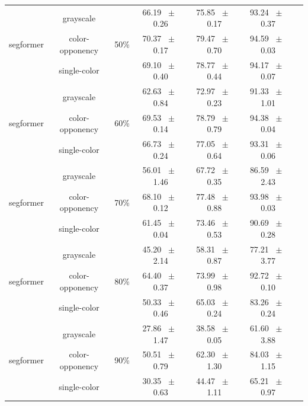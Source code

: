 \begin{table}[h]
\begin{tabular}{@{}lccc ccc@{}}
    \midrule
    \multirow{3}{*}{segformer} & grayscale & \multirow{3}{*}{50\%} & 66.19 ~$\pm$~ 0.26 & 75.85 ~$\pm$~ 0.17 & 93.24 ~$\pm$~ 0.37 \\
    & color-opponency &  & 70.37 ~$\pm$~ 0.17 & 79.47 ~$\pm$~ 0.70 & 94.59 ~$\pm$~ 0.03 \\
    & single-color &  & 69.10 ~$\pm$~ 0.40 & 78.77 ~$\pm$~ 0.44 & 94.17 ~$\pm$~ 0.07 \\
    \midrule
    \multirow{3}{*}{segformer} & grayscale & \multirow{3}{*}{60\%} & 62.63 ~$\pm$~ 0.84 & 72.97 ~$\pm$~ 0.23 & 91.33 ~$\pm$~ 1.01 \\
    & color-opponency &  & 69.53 ~$\pm$~ 0.14 & 78.79 ~$\pm$~ 0.79 & 94.38 ~$\pm$~ 0.04 \\
    & single-color &  & 66.73 ~$\pm$~ 0.24 & 77.05 ~$\pm$~ 0.64 & 93.31 ~$\pm$~ 0.06 \\
    \midrule
    \multirow{3}{*}{segformer} & grayscale & \multirow{3}{*}{70\%} & 56.01 ~$\pm$~ 1.46 & 67.72 ~$\pm$~ 0.35 & 86.59 ~$\pm$~ 2.43 \\
    & color-opponency &  & 68.10 ~$\pm$~ 0.12 & 77.48 ~$\pm$~ 0.88 & 93.98 ~$\pm$~ 0.03 \\
    & single-color &  & 61.45 ~$\pm$~ 0.04 & 73.46 ~$\pm$~ 0.53 & 90.69 ~$\pm$~ 0.28 \\
    \midrule
    \multirow{3}{*}{segformer} & grayscale & \multirow{3}{*}{80\%} & 45.20 ~$\pm$~ 2.14 & 58.31 ~$\pm$~ 0.87 & 77.21 ~$\pm$~ 3.77 \\
    & color-opponency &  & 64.40 ~$\pm$~ 0.37 & 73.99 ~$\pm$~ 0.98 & 92.72 ~$\pm$~ 0.10 \\
    & single-color &  & 50.33 ~$\pm$~ 0.46 & 65.03 ~$\pm$~ 0.24 & 83.26 ~$\pm$~ 0.24 \\
    \midrule
    \multirow{3}{*}{segformer} & grayscale & \multirow{3}{*}{90\%} & 27.86 ~$\pm$~ 1.47 & 38.58 ~$\pm$~ 0.05 & 61.60 ~$\pm$~ 3.88 \\
    & color-opponency &  & 50.51 ~$\pm$~ 0.79 & 62.30 ~$\pm$~ 1.30 & 84.03 ~$\pm$~ 1.15 \\
    & single-color &  & 30.35 ~$\pm$~ 0.63 & 44.47 ~$\pm$~ 1.11 & 65.21 ~$\pm$~ 0.97 \\
    \midrule
    \bottomrule
  \end{tabular}
  \label{tab:sparse_results_segformer_cityscapes}
\end{table}